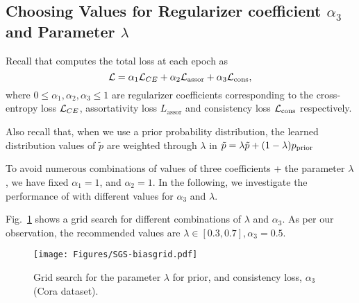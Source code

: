 
% 




\clearpage
\subsection{Choosing Values for Regularizer coefficient \(\alpha_3\) and Parameter \(\lambda\)}
\label{app:gridsearch}
Recall that \sgs computes the total loss at each epoch as
\[
{\mathcal{L}} = \alpha_1{\mathcal{L}}_{CE}+\alpha_2{\mathcal{L}}_\mathrm{assor}+\alpha_3{\mathcal{L}}_\mathrm{cons},
\]
where $0 \leq \alpha_1,\alpha_2,\alpha_3 \leq 1$ are regularizer coefficients corresponding to the cross-entropy loss ${\mathcal{L}}_{CE}$, assortativity loss $L_\mathrm{assor}$ and  consistency loss ${\mathcal{L}}_\mathrm{cons}$ respectively. 

Also recall that, when we use a prior probability distribution, the learned distribution values of $\tilde{p}$ are weighted through $\lambda$ in
$\Tilde{p} = \lambda\Tilde{p}+(1-\lambda) p_\mathrm{prior}$

To avoid numerous combinations of values of three coefficients + the parameter $\lambda$, we have fixed $\alpha_1 = 1$, and $\alpha_2 = 1$. In the following, we investigate the performance of \sgs with different values for $\alpha_3$ and $\lambda$.

Fig.~\ref{fig:consbias} shows a grid search for different combinations of $\lambda$ and $\alpha_3$. As per our observation, the recommended values are $\lambda \in [0.3, 0.7], \alpha_3=0.5$.
\begin{figure}[h]
\centering
\texttt{[image: Figures/SGS-biasgrid.pdf]}
\caption{Grid search for the parameter $\lambda$ for prior, and consistency loss, $\alpha_3$ (Cora dataset).}
\label{fig:consbias}
\end{figure}




